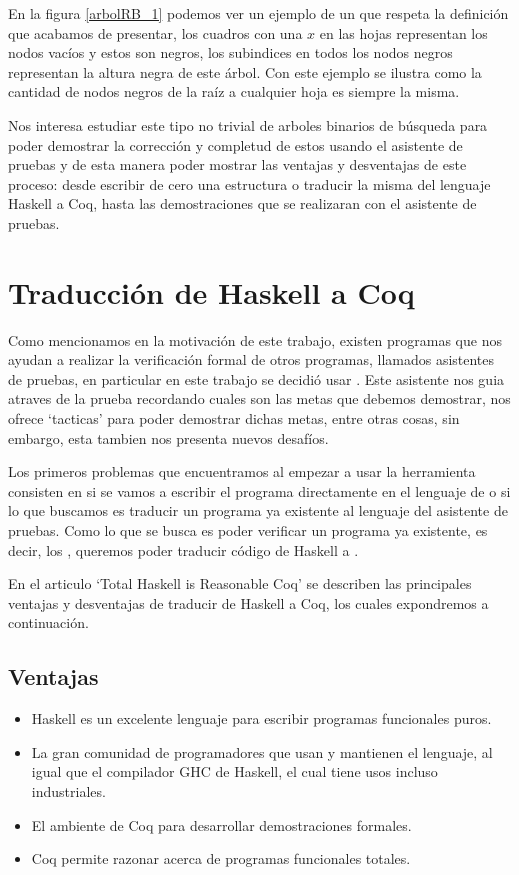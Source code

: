 En la figura \ref{arbolRB_1} podemos ver un ejemplo de un {\arn} que respeta la definici\'on que
acabamos de presentar, los cuadros con una $x$ en las hojas representan los nodos vacíos y estos
son negros, los subindices en todos los nodos negros representan la altura negra de este \'arbol.
Con este ejemplo se ilustra como la cantidad de nodos negros de la ra\'iz a cualquier hoja es
siempre la misma.

Nos interesa estudiar este tipo no trivial de arboles binarios de búsqueda para poder demostrar la
correcci\'on y completud de estos usando el asistente de pruebas {\coq} y de esta manera poder
mostrar las ventajas y desventajas de este proceso: desde escribir de cero una estructura o
traducir la misma del lenguaje Haskell a Coq, hasta las demostraciones que se realizaran con el
asistente de pruebas.

\section{Traducción de Haskell a Coq}
Como mencionamos en la motivación de este trabajo, existen programas que nos ayudan a realizar la
verificaci\'on formal de otros programas, llamados asistentes de pruebas, en particular en este
trabajo se decidió usar {\coq}. Este asistente nos guia atraves de la prueba recordando cuales son
las metas que debemos demostrar, nos ofrece `tacticas' para poder demostrar dichas metas, entre
otras cosas, sin embargo, esta tambien nos presenta nuevos desaf\'ios.

Los primeros problemas que encuentramos al empezar a usar la herramienta consisten en si se vamos a
escribir el programa directamente en el lenguaje de {\coq} o si lo que buscamos es traducir un
programa ya existente al lenguaje del asistente de pruebas. Como lo que se busca es poder verificar
un programa ya existente, es decir, los {\arns}, queremos poder traducir código de Haskell a {\coq}.

En el articulo `Total Haskell is Reasonable Coq' \cite{thrc} se describen las principales ventajas
y desventajas de traducir de Haskell a Coq, los cuales expondremos a continuaci\'on.

\subsection{Ventajas}
\begin{itemize}
    \item Haskell es un excelente lenguaje para escribir programas funcionales puros.
    \item La gran comunidad de programadores que usan y mantienen el lenguaje, al igual que el
    compilador GHC de Haskell, el cual tiene usos incluso industriales.
    \item El ambiente de Coq para desarrollar demostraciones formales.
    \item Coq permite razonar acerca de programas funcionales totales.
\end{itemize}

